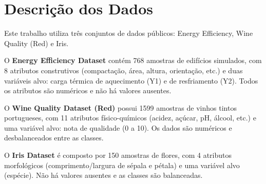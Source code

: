\section{Descrição dos Dados}
Este trabalho utiliza três conjuntos de dados públicos: Energy Efficiency, Wine Quality (Red) e Iris. 

O \textbf{Energy Efficiency Dataset} contém 768 amostras de edifícios simulados, com 8 atributos construtivos (compactação, área, altura, orientação, etc.) e duas variáveis alvo: carga térmica de aquecimento (Y1) e de resfriamento (Y2). Todos os atributos são numéricos e não há valores ausentes.

O \textbf{Wine Quality Dataset (Red)} possui 1599 amostras de vinhos tintos portugueses, com 11 atributos físico-químicos (acidez, açúcar, pH, álcool, etc.) e uma variável alvo: nota de qualidade (0 a 10). Os dados são numéricos e desbalanceados entre as classes.

O \textbf{Iris Dataset} é composto por 150 amostras de flores, com 4 atributos morfológicos (comprimento/largura de sépala e pétala) e uma variável alvo (espécie). Não há valores ausentes e as classes são balanceadas.
